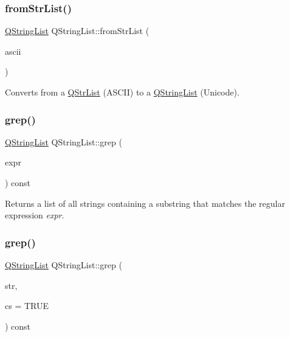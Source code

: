 \subsubsection{\texorpdfstring{fromStrList()}{fromStrList()}}
{\footnotesize\ttfamily \mbox{\hyperlink{class_q_string_list}{Q\+String\+List}} Q\+String\+List\+::from\+Str\+List (\begin{DoxyParamCaption}\item[{const \mbox{\hyperlink{class_q_str_list}{Q\+Str\+List}} \&}]{ascii }\end{DoxyParamCaption})\hspace{0.3cm}{\ttfamily [static]}}

Converts from a \mbox{\hyperlink{class_q_str_list}{Q\+Str\+List}} (A\+S\+C\+II) to a \mbox{\hyperlink{class_q_string_list}{Q\+String\+List}} (Unicode). \mbox{\label{class_q_string_list_ae04b71725ca03fd3bace74af83df48fa}} 
\subsubsection{\texorpdfstring{grep()}{grep()}\hspace{0.1cm}{\footnotesize\ttfamily [1/2]}}
{\footnotesize\ttfamily \mbox{\hyperlink{class_q_string_list}{Q\+String\+List}} Q\+String\+List\+::grep (\begin{DoxyParamCaption}\item[{const \mbox{\hyperlink{class_q_reg_exp}{Q\+Reg\+Exp}} \&}]{expr }\end{DoxyParamCaption}) const}

Returns a list of all strings containing a substring that matches the regular expression {\itshape expr}. \mbox{\label{class_q_string_list_ae22f5a9cd58ef6b7f99946f800625344}} 
\subsubsection{\texorpdfstring{grep()}{grep()}\hspace{0.1cm}{\footnotesize\ttfamily [2/2]}}
{\footnotesize\ttfamily \mbox{\hyperlink{class_q_string_list}{Q\+String\+List}} Q\+String\+List\+::grep (\begin{DoxyParamCaption}\item[{const \mbox{\hyperlink{class_q_string}{Q\+String}} \&}]{str,  }\item[{bool}]{cs = {\ttfamily TRUE} }\end{DoxyParamCaption}) const}

